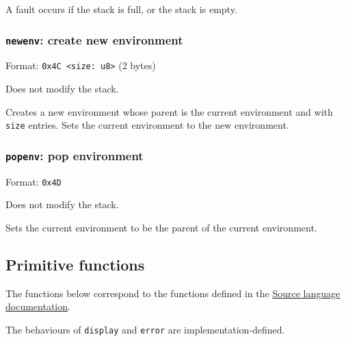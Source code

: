 A fault occurs if the stack is full, or the stack is empty.

\subsubsection{\texttt{newenv}: create new environment}
\label{sec:orgb7d0128}
Format: \texttt{0x4C <size: u8>} (2 bytes)

Does not modify the stack.

Creates a new environment whose parent is the current environment and
with \texttt{size} entries. Sets the current environment to the new
environment.

\subsubsection{\texttt{popenv}: pop environment}
\label{sec:org4cc850b}
Format: \texttt{0x4D}

Does not modify the stack.

Sets the current environment to be the parent of the current
environment.

\subsection{Primitive functions}
\label{sec:org22a9c67}
The functions below correspond to the functions defined in the
\href{https://sicp.comp.nus.edu.sg/source/source\_4/}{Source language
documentation}.

The behaviours of \texttt{display} and \texttt{error} are implementation-defined.

